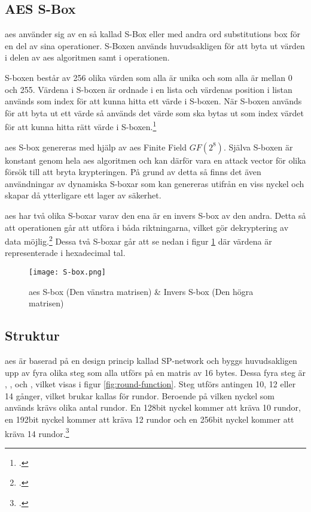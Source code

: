 \subsection{AES S-Box}
\label{sec:aes-sbox}
\acrshort{aes} använder sig av en så kallad S-Box eller med andra ord substitutions box
för en del av sina operationer. S-Boxen används huvudsakligen för att byta ut värden
i  delen av \acrshort{aes} algoritmen samt i
 operationen.

S-boxen består av 256 olika värden som alla är unika och som alla är mellan 0 och 255.
Värdena i S-boxen är ordnade i en lista och värdenas position i listan används som
index för att kunna hitta ett värde i S-boxen. När S-boxen används för att byta ut
ett värde så används det värde som ska bytas ut som index värdet för att kunna hitta
rätt värde i S-boxen.\footcite{sbox_wiki}

\acrshort{aes} S-box genereras med hjälp av \acrshort{aes} Finite Field {$GF(2^8)$}.
Själva S-boxen är konstant genom hela \acrshort{aes} algoritmen och kan därför
vara en attack vector för olika försök till att bryta krypteringen. På grund av
detta så finns det även användningar av dynamiska S-boxar som kan genereras
utifrån en viss nyckel och skapar då ytterligare ett lager av säkerhet.

\acrshort{aes} har två olika S-boxar varav den ena är en invers S-box av den andra.
Detta så att operationen går att utföra i båda riktningarna, vilket gör dekryptering
av data möjlig.\footcite{sbox_wiki} Dessa två S-boxar går att se nedan i figur \ref{fig:aes-sbox} där
värdena är representerade i \gls{hexadecimal} tal.

\begin{figure}[H]
    \texttt{[image: S-box.png]}
    \caption{\acrshort{aes} S-box (Den vänstra matrisen) \& Invers S-box (Den högra matrisen)}
    \label{fig:aes-sbox}
\end{figure}

\subsection{Struktur}
\label{sec:aes-structure}
\acrshort{aes} är baserad på en design princip kallad \gls{SP-network} och byggs huvudsakligen upp av fyra olika steg som alla utförs på en matris av 16 \glspl{byte}. Dessa fyra steg är
, ,  och
, vilket visas i figur \ref{fig:round-function}. Steg utförs antingen 10, 12 eller 14 gånger, vilket brukar kallas för rundor. Beroende på vilken nyckel som används krävs olika antal rundor.
En 128bit nyckel kommer att kräva 10 rundor, en 192bit nyckel kommer att kräva 12 rundor och en 256bit nyckel kommer att kräva 14 rundor.\footcite{daemen1999aes}


